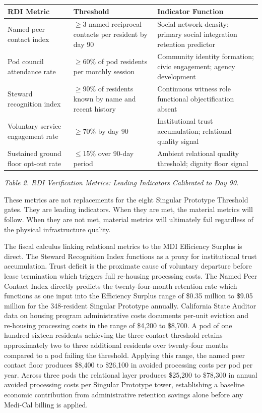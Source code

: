\documentclass[12pt, letterpaper]{article}
\begin{document}
{\singlespacing
\begin{tabularx}{\textwidth}{@{}lp{3cm}X@{}}
\toprule
\rowcolor{rowgray}
RDI Metric & Threshold & Indicator Function \\
\midrule
Named peer contact index & $\geq$3 named reciprocal contacts per resident by day 90 & Social network density; primary social integration retention predictor \\
\rowcolor{rowgray}
Pod council attendance rate & $\geq$60\% of pod residents per monthly session & Community identity formation; civic engagement; agency development \\
Steward recognition index & $\geq$90\% of residents known by name and recent history & Continuous witness role functional objectification absent \\
\rowcolor{rowgray}
Voluntary service engagement rate & $\geq$70\% by day 90 & Institutional trust accumulation; relational quality signal \\
Sustained ground floor opt-out rate & $\leq$15\% over 90-day period & Ambient relational quality threshold; dignity floor signal \\
\bottomrule
\end{tabularx}\par
\vspace{8pt}
\noindent\textit{Table 2. RDI Verification Metrics: Leading Indicators Calibrated to Day 90.}
\par}

These metrics are not replacements for the eight Singular Prototype Threshold gates. They are leading indicators. When they are met, the material metrics will follow. When they are not met, material metrics will ultimately fail regardless of the physical infrastructure quality.

The fiscal calculus linking relational metrics to the MDI Efficiency Surplus is direct. The Steward Recognition Index functions as a proxy for institutional trust accumulation. Trust deficit is the proximate cause of voluntary departure before lease termination which triggers full re-housing processing costs. The Named Peer Contact Index directly predicts the twenty-four-month retention rate which functions as one input into the Efficiency Surplus range of \$0.35 million to \$9.05 million for the 348-resident Singular Prototype annually. California State Auditor data \citep{ca_state_auditor_2021} on housing program administrative costs documents per-unit eviction and re-housing processing costs in the range of \$4,200 to \$8,700. A pod of one hundred sixteen residents achieving the three-contact threshold retains approximately two to three additional residents over twenty-four months compared to a pod failing the threshold. Applying this range, the named peer contact floor produces \$8,400 to \$26,100 in avoided processing costs per pod per year. Across three pods the relational layer produces \$25,200 to \$78,300 in annual avoided processing costs per Singular Prototype tower, establishing a baseline economic contribution from administrative retention savings alone before any Medi-Cal billing is applied.
\end{document}
